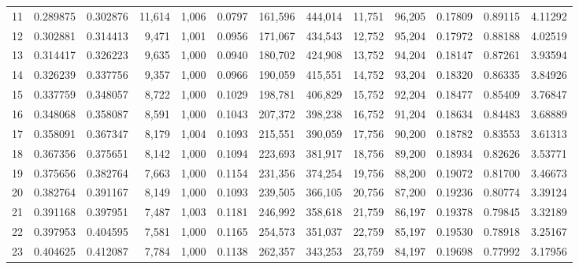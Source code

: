 \begin{tabular}{rrrrrrrrrrrrr}
11  &  0.289875 &  0.302876 &  11,614 &  1,006 &                                     0.0797 &  161,596 &  444,014 &   11,751 &   96,205 &  0.17809 &  0.89115 &  4.11292 \\
12  &  0.302881 &  0.314413 &   9,471 &  1,001 &                                     0.0956 &  171,067 &  434,543 &   12,752 &   95,204 &  0.17972 &  0.88188 &  4.02519 \\
13  &  0.314417 &  0.326223 &   9,635 &  1,000 &                                     0.0940 &  180,702 &  424,908 &   13,752 &   94,204 &  0.18147 &  0.87261 &  3.93594 \\
14  &  0.326239 &  0.337756 &   9,357 &  1,000 &                                     0.0966 &  190,059 &  415,551 &   14,752 &   93,204 &  0.18320 &  0.86335 &  3.84926 \\
15  &  0.337759 &  0.348057 &   8,722 &  1,000 &                                     0.1029 &  198,781 &  406,829 &   15,752 &   92,204 &  0.18477 &  0.85409 &  3.76847 \\
16  &  0.348068 &  0.358087 &   8,591 &  1,000 &                                     0.1043 &  207,372 &  398,238 &   16,752 &   91,204 &  0.18634 &  0.84483 &  3.68889 \\
17  &  0.358091 &  0.367347 &   8,179 &  1,004 &                                     0.1093 &  215,551 &  390,059 &   17,756 &   90,200 &  0.18782 &  0.83553 &  3.61313 \\
18  &  0.367356 &  0.375651 &   8,142 &  1,000 &                                     0.1094 &  223,693 &  381,917 &   18,756 &   89,200 &  0.18934 &  0.82626 &  3.53771 \\
19  &  0.375656 &  0.382764 &   7,663 &  1,000 &                                     0.1154 &  231,356 &  374,254 &   19,756 &   88,200 &  0.19072 &  0.81700 &  3.46673 \\
20  &  0.382764 &  0.391167 &   8,149 &  1,000 &                                     0.1093 &  239,505 &  366,105 &   20,756 &   87,200 &  0.19236 &  0.80774 &  3.39124 \\
21  &  0.391168 &  0.397951 &   7,487 &  1,003 &                                     0.1181 &  246,992 &  358,618 &   21,759 &   86,197 &  0.19378 &  0.79845 &  3.32189 \\
22  &  0.397953 &  0.404595 &   7,581 &  1,000 &                                     0.1165 &  254,573 &  351,037 &   22,759 &   85,197 &  0.19530 &  0.78918 &  3.25167 \\
23  &  0.404625 &  0.412087 &   7,784 &  1,000 &                                     0.1138 &  262,357 &  343,253 &   23,759 &   84,197 &  0.19698 &  0.77992 &  3.17956 \\

\end{tabular}
